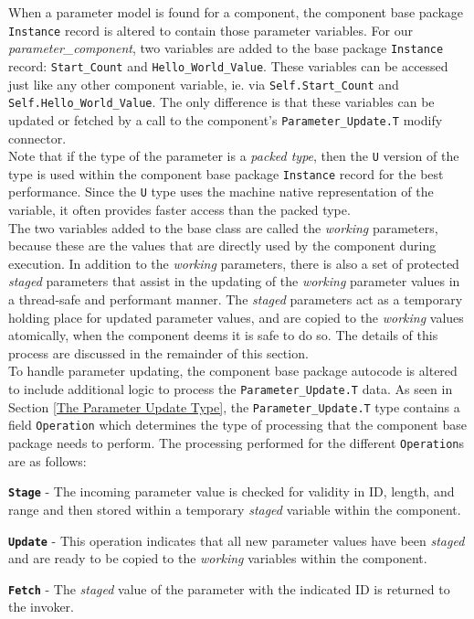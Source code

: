 When a parameter model is found for a component, the component base package \texttt{Instance} record is altered to contain those parameter variables. For our \textit{parameter\_component}, two variables are added to the base package \texttt{Instance} record: \texttt{Start\_Count} and \texttt{Hello\_World\_Value}. These variables can be accessed just like any other component variable, ie. via \texttt{Self.Start\_Count} and \texttt{Self.Hello\_World\_Value}. The only difference is that these variables can be updated or fetched by a call to the component's \texttt{Parameter\_Update.T} modify connector. \\

Note that if the type of the parameter is a \textit{packed type}, then the \texttt{U} version of the type is used within the component base package \texttt{Instance} record for the best performance. Since the \texttt{U} type uses the machine native representation of the variable, it often provides faster access than the packed type. \\

The two variables added to the base class are called the \textit{working} parameters, because these are the values that are directly used by the component during execution. In addition to the \textit{working} parameters, there is also a set of protected \textit{staged} parameters that assist in the updating of the \textit{working} parameter values in a thread-safe and performant manner. The \textit{staged} parameters act as a temporary holding place for updated parameter values, and are copied to the \textit{working} values atomically, when the component deems it is safe to do so. The details of this process are discussed in the remainder of this section. \\

To handle parameter updating, the component base package autocode is altered to include additional logic to process the \texttt{Parameter\_Update.T} data. As seen in Section \ref{The Parameter Update Type}, the \texttt{Parameter\_Update.T} type contains a field \texttt{Operation} which determines the type of processing that the component base package needs to perform. The processing performed for the different \texttt{Operation}s are as follows:

\vspace{5mm} %
\begin{spaceditemize}
  \item \textbf{\texttt{Stage}} - The incoming parameter value is checked for validity in ID, length, and range and then stored within a temporary \textit{staged} variable within the component.
  \item \textbf{\texttt{Update}} - This operation indicates that all new parameter values have been \textit{staged} and are ready to be copied to the \textit{working} variables within the component.
  \item \textbf{\texttt{Fetch}} - The \textit{staged} value of the parameter with the indicated ID is returned to the invoker.
\end{spaceditemize}
\vspace{5mm} %

